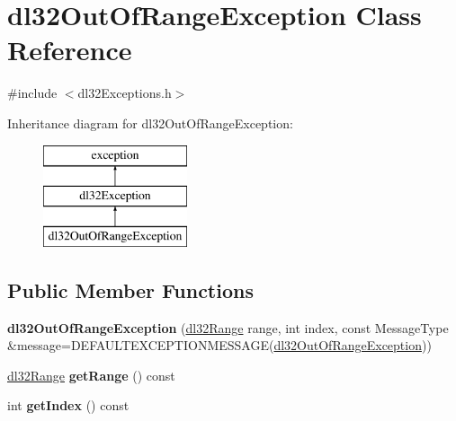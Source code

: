 \hypertarget{classdl32_out_of_range_exception}{\section{dl32\-Out\-Of\-Range\-Exception Class Reference}
\label{classdl32_out_of_range_exception}
}


{\ttfamily \#include $<$dl32\-Exceptions.\-h$>$}

Inheritance diagram for dl32\-Out\-Of\-Range\-Exception\-:\begin{figure}[H]
\begin{center}
\leavevmode
\includegraphics[height=3.000000cm]{classdl32_out_of_range_exception}
\end{center}
\end{figure}
\subsection*{Public Member Functions}
\begin{DoxyCompactItemize}
\item 
\hypertarget{classdl32_out_of_range_exception_a303199fc1f2cec1ec5de5fd98daf1338}{{\bfseries dl32\-Out\-Of\-Range\-Exception} (\hyperlink{structdl32_range}{dl32\-Range} range, int index, const Message\-Type \&message=D\-E\-F\-A\-U\-L\-T\-E\-X\-C\-E\-P\-T\-I\-O\-N\-M\-E\-S\-S\-A\-G\-E(\hyperlink{classdl32_out_of_range_exception}{dl32\-Out\-Of\-Range\-Exception}))}\label{classdl32_out_of_range_exception_a303199fc1f2cec1ec5de5fd98daf1338}

\item 
\hypertarget{classdl32_out_of_range_exception_aa42f028e13e3df1409bd8b619a88caca}{\hyperlink{structdl32_range}{dl32\-Range} {\bfseries get\-Range} () const }\label{classdl32_out_of_range_exception_aa42f028e13e3df1409bd8b619a88caca}

\item 
\hypertarget{classdl32_out_of_range_exception_a1996137da249dc6bf760826dca0fc3df}{int {\bfseries get\-Index} () const }\label{classdl32_out_of_range_exception_a1996137da249dc6bf760826dca0fc3df}

\end{DoxyCompactItemize}
